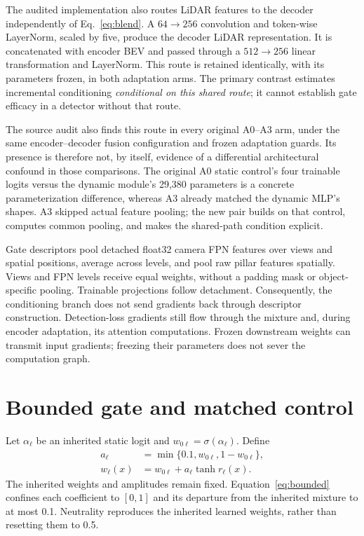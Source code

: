 The audited implementation also routes LiDAR features to the decoder independently of Eq.~\eqref{eq:blend}. A $64\!\rightarrow\!256$ convolution and token-wise LayerNorm, scaled by five, produce the decoder LiDAR representation. It is concatenated with encoder BEV and passed through a $512\!\rightarrow\!256$ linear transformation and LayerNorm. This route is retained identically, with its parameters frozen, in both adaptation arms. The primary contrast estimates incremental conditioning \emph{conditional on this shared route}; it cannot establish gate efficacy in a detector without that route.

The source audit also finds this route in every original A0--A3 arm, under the same encoder--decoder fusion configuration and frozen adaptation guards. Its presence is therefore not, by itself, evidence of a differential architectural confound in those comparisons. The original A0 static control's four trainable logits versus the dynamic module's 29,380 parameters is a concrete parameterization difference, whereas A3 already matched the dynamic MLP's shapes. A3 skipped actual feature pooling; the new pair builds on that control, computes common pooling, and makes the shared-path condition explicit.

Gate descriptors pool detached float32 camera FPN features over views and spatial positions, average across levels, and pool raw pillar features spatially. Views and FPN levels receive equal weights, without a padding mask or object-specific pooling. Trainable projections follow detachment. Consequently, the conditioning branch does not send gradients back through descriptor construction. Detection-loss gradients still flow through the mixture and, during encoder adaptation, its attention computations. Frozen downstream weights can transmit input gradients; freezing their parameters does not sever the computation graph.

\section{Bounded gate and matched control}
Let $\alpha_\ell$ be an inherited static logit and $w_{0\ell}=\sigma(\alpha_\ell)$. Define
\begin{align}
 a_\ell&=\min\{0.1,w_{0\ell},1-w_{0\ell}\},\\
 w_\ell(x)&=w_{0\ell}+a_\ell\tanh r_\ell(x).
 \label{eq:bounded}
\end{align}
The inherited weights and amplitudes remain fixed. Equation~\eqref{eq:bounded} confines each coefficient to $[0,1]$ and its departure from the inherited mixture to at most 0.1. Neutrality reproduces the inherited learned weights, rather than resetting them to 0.5.

